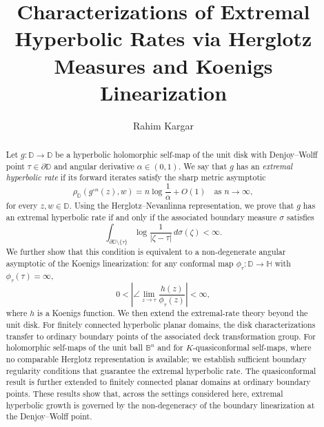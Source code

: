 \documentclass[12pt]{amsart}
\numberwithin{equation}{section}
\theoremstyle{plain}
\theoremstyle{definition}
\begin{document}


\title[Characterizations of Extremal Hyperbolic Rates]%
{Characterizations of Extremal Hyperbolic Rates via Herglotz Measures and Koenigs Linearization}

\author[R.~Kargar]{Rahim Kargar}
\address{Department of Mathematics and Statistics,
  University of Turku, Turku, Finland}


\begin{abstract}
Let $g:\mathbb{D}\to\mathbb{D}$ be a hyperbolic holomorphic self-map of
the unit disk with Denjoy--Wolff point $\tau\in\partial\mathbb{D}$ and
angular derivative $\alpha\in(0,1)$. We say that $g$ has an
\textit{extremal hyperbolic rate} if its forward iterates satisfy the
sharp metric asymptotic
\begin{equation*}
\rho_{\mathbb{D}}(g^{\circ n}(z),w)
=
n\log\frac{1}{\alpha}
+
O(1)
\quad\text{as }n\to\infty,
\end{equation*}
for every $z,w\in\mathbb{D}$. Using the Herglotz--Nevanlinna
representation, we prove that $g$ has an extremal hyperbolic rate if and
only if the associated boundary measure $\sigma$ satisfies
\begin{equation*}
\int_{\partial\mathbb{D}\setminus\{\tau\}}
\log\frac{1}{|\zeta-\tau|}
\,d\sigma(\zeta)
<
\infty.
\end{equation*}
We further show that this condition is equivalent to a non-degenerate
angular asymptotic of the Koenigs linearization: for any conformal map
$\phi_\tau:\mathbb{D}\to\mathbb{H}$ with $\phi_\tau(\tau)=\infty$,
\begin{equation*}
0<
\left|
\angle\lim_{z\to\tau}
\frac{h(z)}{\phi_\tau(z)}
\right|
<
\infty,
\end{equation*}
where $h$ is a Koenigs function.
We then extend the extremal-rate theory beyond the unit disk. For
finitely connected hyperbolic planar domains, the disk characterizations
transfer to ordinary boundary points of the associated deck
transformation group. For holomorphic self-maps of the unit ball
$\mathbb{B}^n$ and for $K$-quasiconformal self-maps, where no comparable
Herglotz representation is available; we establish sufficient boundary
regularity conditions that guarantee the extremal hyperbolic rate. The
quasiconformal result is further extended to finitely connected planar
domains at ordinary boundary points. These results show that, across
the settings considered here, extremal hyperbolic growth is governed by
the non-degeneracy of the boundary linearization at the Denjoy--Wolff
point.
\end{abstract}
\maketitle
\end{document}
